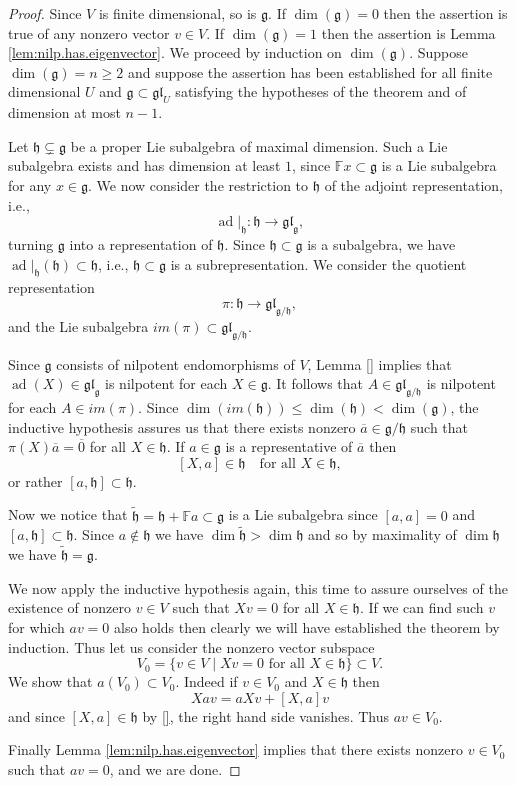 \documentclass[12pt]{article}
\theoremstyle{plain}
\theoremstyle{definition}
\numberwithin{equation}{section}
\DeclareMathOperator{\ad}{ad}
\newcommand{\wtil}[1]{\widetilde{#1}}
\newcommand{\ov}[1]{\overline#1}
\newcommand{\im}{im}
\newcommand{\F}{\mathbb{F}}
\newcommand{\g}{\mathfrak{g}}
\newcommand{\h}{\mathfrak{h}}
\newcommand{\gll}{\mathfrak{gl}}
\begin{document}
\begin{proof}
Since $V$ is finite dimensional, so is $\g$. If $\dim(\g) = 0$ then the assertion is true of any nonzero vector $v \in V$. If $\dim(\g) = 1$ then the assertion is Lemma \ref{lem:nilp.has.eigenvector}. We proceed by induction on $\dim(\g)$. Suppose $\dim(\g) = n \geq 2$ and suppose the assertion has been established for all finite dimensional $U$ and $\g \subset \gll_U$ satisfying the hypotheses of the theorem and of dimension at most $n-1$.

Let $\h \subsetneq \g$ be a proper Lie subalgebra of maximal dimension. Such a Lie subalgebra exists and has dimension at least $1$, since $\F x \subset \g$ is a Lie subalgebra for any $x \in \g$. We now consider the restriction to $\h$ of the adjoint representation, i.e.,
\[
\ad|_{\h} : \h \rightarrow \gll_{\g},
\]
turning $\g$ into a representation of $\h$. Since $\h \subset \g$ is a subalgebra, we have $\ad|_{\h}(\h) \subset \h$, i.e., $\h \subset \g$ is a subrepresentation. We consider the quotient representation
\[
\pi : \h \rightarrow \gll_{\g/\h},
\]
and the Lie subalgebra $\im(\pi) \subset \gll_{\g/\h}$.

Since $\g$ consists of nilpotent endomorphisms of $V$, Lemma \ref{} implies that $\ad(X) \in \gll_{\g}$ is nilpotent for each $X \in \g$. It follows that $A \in \gll_{\g/\h}$ is nilpotent for each $A \in \im(\pi)$. Since $\dim(\im(\h)) \leq \dim(\h) < \dim(\g)$, the inductive hypothesis assures us that there exists nonzero $\ov{a} \in \g/\h$ such that $\pi(X)\ov{a} = \ov{0}$ for all $X \in \h$. If $a \in \g$ is a representative of $\ov{a}$ then
\[
[X, a] \in \h \quad \text{for all $X \in \h$},
\]
or rather $[a, \h] \subset \h$.

Now we notice that $\wtil{\h} = \h + \F a \subset \g$ is a Lie subalgebra since $[a, a] = 0$ and $[a, \h] \subset \h$. Since $a \notin \h$ we have $\dim\wtil\h > \dim\h$ and so by maximality of $\dim\h$ we have $\wtil\h = \g$.

We now apply the inductive hypothesis again, this time to assure ourselves of the existence of nonzero $v \in V$ such that $Xv = 0$ for all $X \in \h$. If we can find such $v$ for which $av = 0$ also holds then clearly we will have established the theorem by induction. Thus let us consider the nonzero vector subspace
\[
V_0 = \{v \in V \mid \text{$Xv = 0$ for all $X \in \h$} \} \subset V.
\]
We show that $a(V_0) \subset V_0$. Indeed if $v \in V_0$ and $X \in \h$ then
\[
X a v = a X v + [X, a] v
\]
and since $[X, a] \in \h$ by \eqref{}, the right hand side vanishes. Thus $av \in V_0$.

Finally Lemma \ref{lem:nilp.has.eigenvector} implies that there exists nonzero $v \in V_0$ such that $av = 0$, and we are done.
\end{proof}
\end{document}
